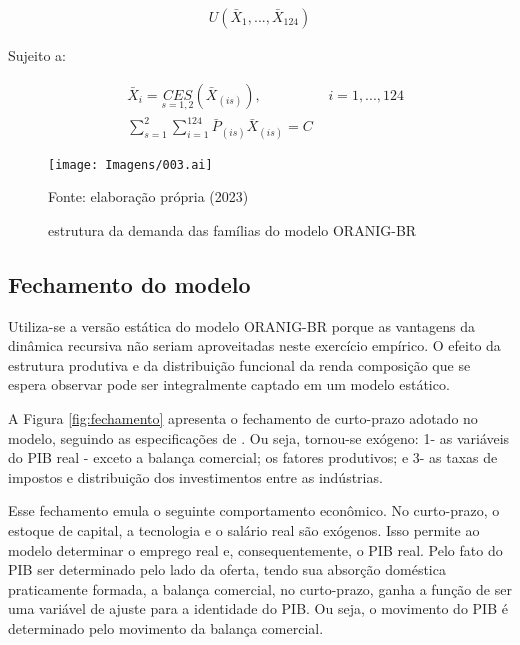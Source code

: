 \begin{align*}
	U(\bar{X}_1, ... , \bar{X}_{124})
\end{align*}

Sujeito a:

\begin{align}
	&\bar{X}_i = \underset{s = 1, 2}{CES} (\bar{X}_{(is)}), \hspace{2cm} i = 1, ... , 124 \\
	&\sum_{s = 1}^{2} \sum_{i = 1}^{124} \bar{P}_{(is)} \bar{X}_{(is)} = C
\end{align}

\begin{landscape}
	\begin{figure}
		\centering
		\texttt{[image: Imagens/003.ai]}
		\caption{estrutura da demanda das famílias do modelo ORANIG-BR}
		\label{fig:estrutura_familia}
		\footnotesize
		Fonte: elaboração própria (2023)
	\end{figure}
\end{landscape}

\subsection{Fechamento do modelo} \label{subsec:fechamento}

Utiliza-se a versão estática do modelo ORANIG-BR porque as vantagens da dinâmica recursiva não seriam aproveitadas neste exercício empírico. O efeito da estrutura produtiva e da distribuição funcional da renda composição que se espera observar pode ser integralmente captado em um modelo estático.

A Figura \ref{fig:fechamento} apresenta o fechamento de curto-prazo adotado no modelo, seguindo as especificações de \textcite{horridge03}. Ou seja, tornou-se exógeno: 1- as variáveis do PIB real - exceto a balança comercial; os fatores produtivos; e 3- as taxas de impostos e distribuição dos investimentos entre as indústrias.

Esse fechamento emula o seguinte comportamento econômico. No curto-prazo, o estoque de capital, a tecnologia e o salário real são exógenos. Isso permite ao modelo determinar o emprego real e, consequentemente, o PIB real. Pelo fato do PIB ser determinado pelo lado da oferta, tendo sua absorção doméstica praticamente formada, a balança comercial, no curto-prazo, ganha a função de ser uma variável de ajuste para a identidade do PIB. Ou seja, o movimento do PIB é determinado pelo movimento da balança comercial.

